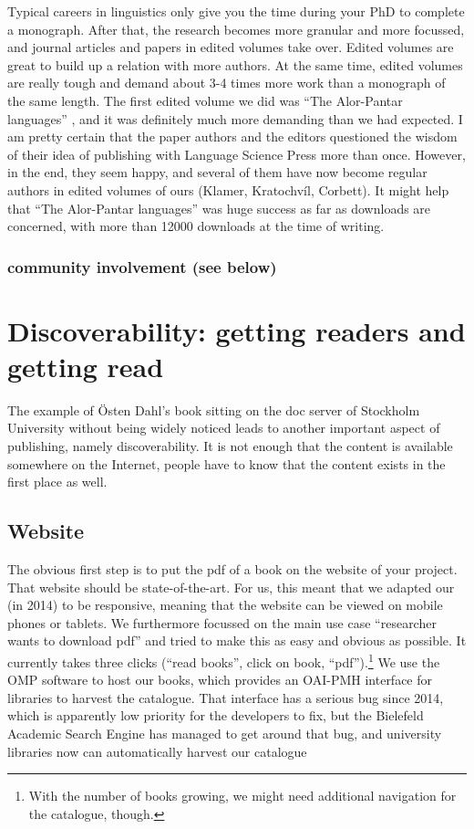 \documentclass[guidelines,nonflat,modfonts] {langsci/langscibook}
\begin{document}
Typical careers in linguistics only give you the time during your PhD to complete a monograph. After that, the research becomes more granular and more focussed, and journal articles and papers in edited volumes take over. Edited volumes are great to build up a relation with more authors. At the same time, edited volumes are really tough and demand about 3-4 times more work than a monograph of the same length. The first edited volume we did was ``The Alor-Pantar languages'' \citep{Klamer2014}, and it was definitely much more demanding than we had expected. I am pretty certain that the paper authors and the editors questioned the wisdom of their idea of publishing with Language Science Press more than once. However, in the end, they seem happy, and several of them have now become regular authors in edited volumes of ours (Klamer, Kratochvíl, Corbett). It might help that ``The Alor-Pantar languages'' was  huge success as far as downloads are concerned, with more than 12000 downloads at the time of writing. 

 
\subsubsection{community involvement (see below)}

\section{Discoverability: getting readers and getting read}
The example of Östen Dahl's book sitting on the doc server of Stockholm University without being widely noticed leads to another important aspect of publishing, namely discoverability. It is not enough that the content is available somewhere on the Internet, people have to know that the content exists in the first place as well. 

\subsection{Website}
The obvious first step is to put the pdf of a book on the website of your project. That website should be state-of-the-art. For us, this meant that we adapted our (in 2014) to be responsive, meaning that the website can be viewed on mobile phones or tablets. We furthermore focussed on the main use case ``researcher wants to download pdf'' and tried to make this as easy and obvious as possible. It currently takes three clicks (``read books'', click on book, ``pdf'').\footnote{With the number of books growing, we might need additional navigation for the catalogue, though.} We use the OMP software to host our books, which provides an OAI-PMH interface for libraries to harvest the catalogue. That interface has a serious bug since 2014, which is apparently low priority for the developers to fix, but the Bielefeld Academic Search Engine has managed to get around that bug, and university libraries now can automatically harvest our catalogue
\end{document}
